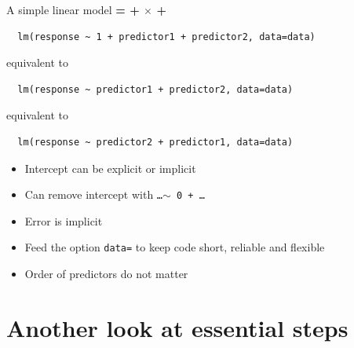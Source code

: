\documentclass{beamer}
\makeatletter
\newenvironment{kframe}{%
 \def\at@end@of@kframe{}%
 \ifinner\ifhmode%
  \def\at@end@of@kframe{\end{minipage}}%
  \begin{minipage}{\columnwidth}%
 \fi\fi%
 \def\FrameCommand##1{\hskip\@totalleftmargin \hskip-\fboxsep
 \colorbox{shadecolor}{##1}\hskip-\fboxsep
     \hskip-\linewidth \hskip-\@totalleftmargin \hskip\columnwidth}%
 \MakeFramed {\advance\hsize-\width
   \@totalleftmargin\z@ \linewidth\hsize
   \@setminipage}}%
 {\par\unskip\endMakeFramed%
 \at@end@of@kframe}
\newenvironment{knitrout}{}{} %
\makeatother
\begin{document}
\begin{frame}[fragile]{A simple linear model}
  \textbf{{\color{purple}{Response}} = {\color{blue}{Intercept}} + {\color{red}{Slope}} $\times$ {\color{orange}{Predictor}} + {\color{gray}{Error}}} \\
  \vspace{-0.1cm}
  \begin{knitrout}
\color{fgcolor}\begin{kframe}
\footnotesize
\begin{verbatim}
  lm(response ~ 1 + predictor1 + predictor2, data=data)
\end{verbatim}
\end{kframe}
\end{knitrout}
equivalent to
  \begin{knitrout}
\color{fgcolor}\begin{kframe}
\footnotesize
\begin{verbatim}
  lm(response ~ predictor1 + predictor2, data=data) \end{verbatim}
\end{kframe}
\end{knitrout}
equivalent to
  \begin{knitrout}
\color{fgcolor}\begin{kframe}
\footnotesize
\begin{verbatim}
  lm(response ~ predictor2 + predictor1, data=data) \end{verbatim}
\end{kframe}
\end{knitrout}

\begin{itemize}
  \item Intercept can be explicit or implicit
  \item Can remove intercept with \texttt{\dots $\sim $ 0 + \dots}
  \item Error is implicit
  \item Feed the option \texttt{data=} to keep code short, reliable and flexible
  \item Order of predictors do not matter 
\end{itemize}

\end{frame}


\section{Another look at essential steps}
\end{document}

